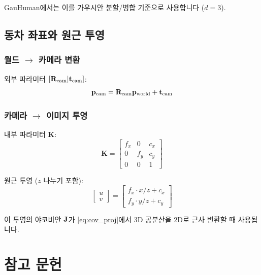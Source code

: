 \documentclass[11pt, a4paper]{report}
\begin{document}
GauHuman에서는 이를 가우시안 분할/병합 기준으로 사용합니다 ($d=3$).


\section{동차 좌표와 원근 투영}
\label{sec:projection}

\subsection{월드 $\rightarrow$ 카메라 변환}

외부 파라미터 $[\mathbf{R}_{\text{cam}} | \mathbf{t}_{\text{cam}}]$:
\begin{equation}
\mathbf{p}_{\text{cam}} = \mathbf{R}_{\text{cam}} \mathbf{p}_{\text{world}} + \mathbf{t}_{\text{cam}}
\end{equation}

\subsection{카메라 $\rightarrow$ 이미지 투영}

내부 파라미터 $\mathbf{K}$:
\begin{equation}
\mathbf{K} = \begin{bmatrix}
f_x & 0 & c_x \\
0 & f_y & c_y \\
0 & 0 & 1
\end{bmatrix}
\end{equation}

원근 투영 ($z$ 나누기 포함):
\begin{equation}
\begin{bmatrix} u \\ v \end{bmatrix} = \begin{bmatrix} f_x \cdot x/z + c_x \\ f_y \cdot y/z + c_y \end{bmatrix}
\end{equation}

이 투영의 야코비안 $\mathbf{J}$가 \cref{eq:cov_proj}에서 3D 공분산을 2D로 근사 변환할 때 사용됩니다.


\chapter*{참고 문헌}
\end{document}
